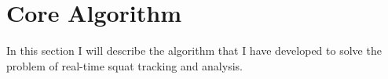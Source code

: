 \section{Core Algorithm}

In this section I will describe the algorithm that I have developed to solve the problem of real-time squat tracking and analysis.



